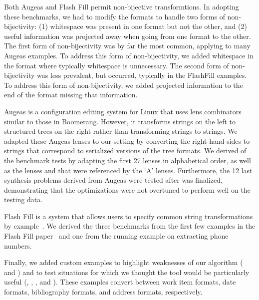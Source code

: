 \documentclass[sigplan,acmsmall]{acmart}
\begin{document}
Both Augeas and Flash Fill permit non-bijective transformtions.  In adopting
these benchmarks, we had to
modify the formats to handle two forms of non-bijectivity: (1) whitespace was
present in one format but not the other, and (2) useful information was projected
away when going from one format to the other.  The first form of non-bijectivity
was by far the most common, applying to many Augeas examples.  To address this
form of
non-bijectivity, we added whitespace in the format where typically whitespace is
unnecessary.  The second form of non-bijectivity was less prevalent, but
occurred, typically in the FlashFill examples.  To address this form of
non-bijectivity, we
added projected information to the end of the format missing that information.

Augeas is a configuration editing system for Linux that uses lens
combinators similar to those in Boomerang. However, it transforms
strings on the left to structured trees on the right rather than
transforming strings to strings.
We adapted these Augeas lenses to our setting by converting the
right-hand sides to strings that correspond to serialized versions
of the tree formats.  
We derived \AugeasCount of the benchmark tests by
adapting the first 27 lenses in alphabetical order, as well as the lenses
 and  that were referenced
by the `A' lenses.
Furthermore, the 12 last synthesis problems derived
from Augeas were tested after \Optician{} was
finalized, demonstrating that the optimizations were not
overtuned to perform well on the testing data.

Flash Fill is a system that allows users to specify common string
transformations by example~\cite{gulwani-popl-2014}.  
We derived the three benchmarks from the first few examples in the
Flash Fill paper~\cite{gulwani-popl-2014} and one from the running example on
extracting phone numbers.

Finally, we added custom examples to highlight weaknesses of
our algorithm ( and ) 
and to test situations for which we thought the tool would be
particularly useful (, , ,
and ).   These examples convert between work item formats, date
formats, bibliography formats, and address formats, respectively.
\end{document}
